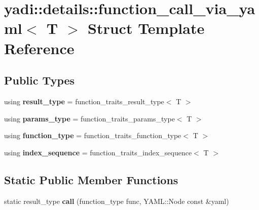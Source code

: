 \hypertarget{structyadi_1_1details_1_1function__call__via__yaml}{}\section{yadi\+:\+:details\+:\+:function\+\_\+call\+\_\+via\+\_\+yaml$<$ T $>$ Struct Template Reference}
\label{structyadi_1_1details_1_1function__call__via__yaml}
\subsection*{Public Types}
\begin{DoxyCompactItemize}
\item 
\mbox{\label{structyadi_1_1details_1_1function__call__via__yaml_afaa3b21dcbc0e1a15738d1b6d2aa01d0}} 
using {\bfseries result\+\_\+type} = function\+\_\+traits\+\_\+result\+\_\+type$<$ T $>$
\item 
\mbox{\label{structyadi_1_1details_1_1function__call__via__yaml_a2e36b4fa05d0394972a9f45f06d7ab05}} 
using {\bfseries params\+\_\+type} = function\+\_\+traits\+\_\+params\+\_\+type$<$ T $>$
\item 
\mbox{\label{structyadi_1_1details_1_1function__call__via__yaml_a81a291cb5024c27cd93a3853b47a265b}} 
using {\bfseries function\+\_\+type} = function\+\_\+traits\+\_\+function\+\_\+type$<$ T $>$
\item 
\mbox{\label{structyadi_1_1details_1_1function__call__via__yaml_a63df821b6a02c14851dabbddd3dd18a0}} 
using {\bfseries index\+\_\+sequence} = function\+\_\+traits\+\_\+index\+\_\+sequence$<$ T $>$
\end{DoxyCompactItemize}
\subsection*{Static Public Member Functions}
\begin{DoxyCompactItemize}
\item 
\mbox{\label{structyadi_1_1details_1_1function__call__via__yaml_a811aa6a0b4643bbf95384e108635e459}} 
static result\+\_\+type {\bfseries call} (function\+\_\+type func, Y\+A\+M\+L\+::\+Node const \&yaml)
\end{DoxyCompactItemize}



